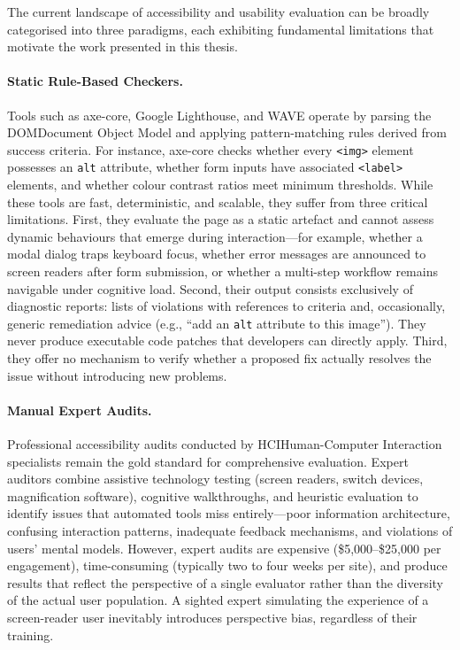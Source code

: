 The current landscape of accessibility and usability evaluation can be broadly categorised into three paradigms, each exhibiting fundamental limitations that motivate the work presented in this thesis.

\paragraph{Static Rule-Based Checkers.}
Tools such as axe-core, Google Lighthouse, and WAVE operate by parsing the \acrfull{DOM}{Document Object Model} and applying pattern-matching rules derived from  success criteria. For instance, axe-core checks whether every \texttt{<img>} element possesses an \texttt{alt} attribute, whether form inputs have associated \texttt{<label>} elements, and whether colour contrast ratios meet minimum thresholds. While these tools are fast, deterministic, and scalable, they suffer from three critical limitations. First, they evaluate the page as a static artefact and cannot assess dynamic behaviours that emerge during interaction---for example, whether a modal dialog traps keyboard focus, whether error messages are announced to screen readers after form submission, or whether a multi-step workflow remains navigable under cognitive load. Second, their output consists exclusively of diagnostic reports: lists of violations with references to  criteria and, occasionally, generic remediation advice (e.g., ``add an \texttt{alt} attribute to this image''). They never produce executable code patches that developers can directly apply. Third, they offer no mechanism to verify whether a proposed fix actually resolves the issue without introducing new problems.

\paragraph{Manual Expert Audits.}
Professional accessibility audits conducted by \acrfull{HCI}{Human-Computer Interaction} specialists remain the gold standard for comprehensive evaluation. Expert auditors combine assistive technology testing (screen readers, switch devices, magnification software), cognitive walkthroughs, and heuristic evaluation to identify issues that automated tools miss entirely---poor information architecture, confusing interaction patterns, inadequate feedback mechanisms, and violations of users' mental models. However, expert audits are expensive (\$5,000--\$25,000 per engagement), time-consuming (typically two to four weeks per site), and produce results that reflect the perspective of a single evaluator rather than the diversity of the actual user population. A sighted expert simulating the experience of a screen-reader user inevitably introduces perspective bias, regardless of their training.

